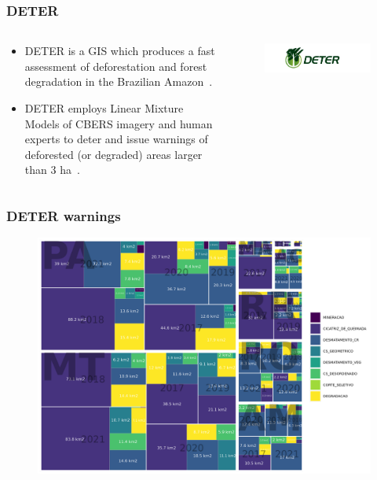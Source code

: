 \documentclass[aspectratio=169]{beamer}
\begin{document}
\begin{frame}
    \frametitle{DETER}
    \begin{columns}
      \begin{column}{0.4\textwidth}
        \begin{itemize}
            \item DETER is a GIS which produces a fast assessment of 
              deforestation and forest degradation in the Brazilian 
              Amazon~\cite{Shimabukuro:2006}.
            \item DETER employs Linear Mixture Models of CBERS imagery and 
              human experts to deter and issue warnings of deforested 
              (or degraded) areas larger than 3 ha~\cite{dealmeida2022}.
        \end{itemize}
      \end{column}
      \begin{column}{0.6\textwidth}
        \begin{figure}
          \centering
          \includegraphics[width=1.2\textwidth]{logos/deterblogo.jpg}
        \end{figure}
      \end{column}
    \end{columns}
\end{frame}

\begin{frame}
    \frametitle{DETER warnings}
    \begin{figure}[h] 
        \includegraphics[width=0.75\linewidth]
        {figures/plot_deter_area_by_state_pyear_type.png}
        \label{fig:deter_area_state_pyear_type}
    \end{figure}
\end{frame}
\end{document}
